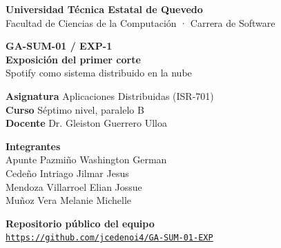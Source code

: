 \documentclass[11pt,a4paper]{article}
\begin{document}
\centering
\vspace*{0.6cm}
{\Large\sffamily\bfseries Universidad Técnica Estatal de Quevedo}\\[0.5em]
Facultad de Ciencias de la Computación · Carrera de Software

\par\vfill
{\sffamily\bfseries GA-SUM-01 / EXP-1}\\[0.45em]
{\LARGE\sffamily\bfseries Exposición del primer corte}\\[0.35em]
{\large Spotify como sistema distribuido en la nube}

\par\vfill
\textbf{Asignatura} \quad Aplicaciones Distribuidas (ISR-701)\\
\textbf{Curso} \quad Séptimo nivel, paralelo B\\
\textbf{Docente} \quad Dr. Gleiston Guerrero Ulloa

\par\vfill
{\large\sffamily\bfseries Integrantes}\\[0.35em]
Apunte Pazmiño Washington German\\
Cedeño Intriago Jilmar Jesus\\
Mendoza Villarroel Elian Jossue\\
Muñoz Vera Melanie Michelle

\par\vfill
{\large\sffamily\bfseries Repositorio público del equipo}\\[0.35em]
\mbox{\href{https://github.com/jcedenoi4/GA-SUM-01-EXP}{\nolinkurl{https://github.com/jcedenoi4/GA-SUM-01-EXP}}}
\par\vspace*{0.5cm}
\end{document}

